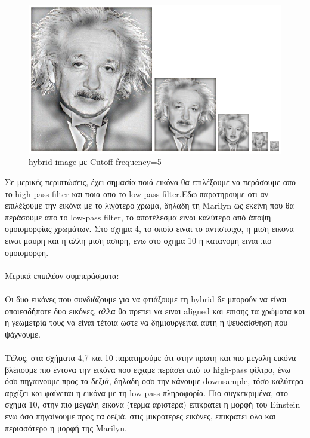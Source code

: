 \documentclass{article}
\newcommand{\tl}[1]{\textlatin{#1}}
\begin{document}
	\begin{figure}[H]
		\centering
		\includegraphics[scale=1]{./res/f3.eps}
		\caption{\tl{hybrid image} με \tl{Cutoff frequency}=5}
	\end{figure}
	\noindent
	Σε μερικές περιπτώσεις, έχει σημασία ποιά εικόνα θα επιλέξουμε να περάσουμε απο το \tl{high-pass filter} και ποια απο το \tl{low-pass filter}.Εδω παρατηρουμε οτι αν επιλέξουμε την εικόνα με το λιγότερο χρωμα, δηλαδη τη \tl{Marilyn} ως εκείνη που θα περάσουμε απο το \tl{low-pass filter}, το αποτέλεσμα ειναι καλύτερο από άποψη ομοιομορφίας χρωμάτων. Στο σχημα 4, το οποίο ειναι το αντίστοιχο, η μιση εικονα ειναι μαυρη και η αλλη μιση ασπρη, ενω στο σχημα 10 η κατανομη ειναι πιο ομοιομορφη. 
	\\
	\\
	\noindent
	\underline{Μερικά επιπλέον συμπεράσματα: }\\ \\
	\noindent
	Οι δυο εικόνες που συνδιάζουμε για να φτιάξουμε τη \tl{hybrid} δε μπορούν να είναι οποιεσδήποτε δυο εικόνες, αλλα θα πρεπει να ειναι \tl{aligned} και επισης τα χρώματα και η γεωμετρία τους να είναι τέτοια ωστε να δημιουργείται αυτη η ψευδαίσθηση που ψάχνουμε.\\ \\
	\noindent
	Τέλος, στα σχήματα 4,7 και 10 παρατηρούμε ότι στην πρωτη και πιο μεγαλη εικόνα βλέπουμε πιο έντονα την εικόνα που είχαμε περάσει από το \tl{high-pass} φίλτρο, ένω όσο πηγαινουμε προς τα δεξιά, δηλαδη οσο την κάνουμε \tl{downsample}, τόσο καλύτερα αρχίζει και φαίνεται η εικόνα με τη \tl{low-pass} πληροφορία. Πιο συγκεκριμένα, στο σχήμα 10, στην πιο μεγαλη εικονα (τερμα αριστερά) επικρατει η μορφή του \tl{Einstein} ενω όσο πηγαίνουμε προς τα δεξιά, στις μικρότερες εικόνες, επικρατει ολο και περισσότερο η μορφή της \tl{Marilyn}. 
\end{document}
